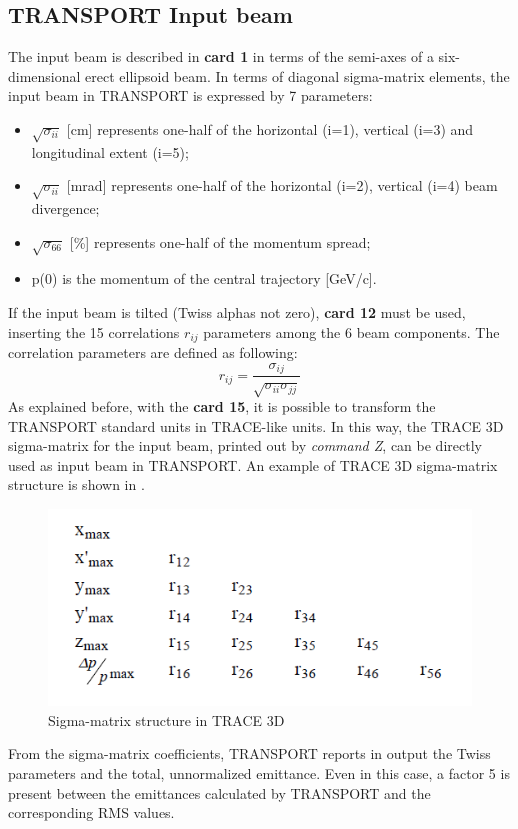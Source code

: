 \subsection{TRANSPORT Input beam}
\label{ssec:TRAN_input}
The input beam is described in \textbf{card 1} in terms of the semi-axes of a six-dimensional erect ellipsoid beam. In terms of diagonal sigma-matrix elements, the input beam in TRANSPORT is expressed by 7 parameters:
\begin{itemize}
\item $\sqrt{\sigma_{ii}}$ [cm] represents one-half of the horizontal (i=1), vertical (i=3) and longitudinal extent (i=5);
\item $\sqrt{\sigma_{ii}}$ [mrad] represents one-half of the horizontal (i=2), vertical (i=4) beam divergence;
\item $\sqrt{\sigma_{66}}$ [\%] represents one-half of the momentum spread;
\item p(0) is the momentum of the central trajectory  [GeV/c].
\end{itemize}
If the input beam is tilted (Twiss alphas not zero), \textbf{ card 12} must be used, inserting the 15 correlations $r_{ij}$ parameters among the 6 beam components. The correlation parameters are defined as following:
\begin{equation}
r_{ij}=\frac{\sigma_{ij}}{\sqrt{\sigma_{ii}\sigma_{jj}}}
\end{equation}
As explained before, with the \textbf{card 15}, it is possible to transform the TRANSPORT standard units in TRACE-like units. In this way, the TRACE 3D sigma-matrix for the input beam, printed out by \textit{command Z}, can be directly used as input beam in TRANSPORT. An example of TRACE 3D sigma-matrix structure is shown in .
\begin{figure}[htbp]
 \centering
     \includegraphics[width=0.5\textwidth-0.6cm, keepaspectratio=true]{figures/Benchmarks/TRACE_z.png}
    \caption{Sigma-matrix structure in TRACE 3D \cite{Trace_man}}
    \label{fig:trace_z}
\end{figure}
From the sigma-matrix coefficients, TRANSPORT reports in output the Twiss parameters and the total, unnormalized emittance. Even in this case, a factor 5 is present between the emittances calculated by TRANSPORT and the corresponding RMS values.
